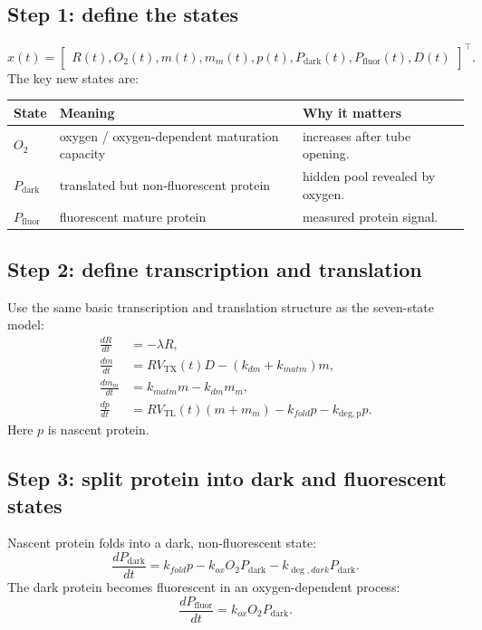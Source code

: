 \documentclass[11pt]{article}
\newcommand{\TX}{\mathrm{TX}}
\newcommand{\TL}{\mathrm{TL}}
\newcommand{\degp}{\mathrm{deg,p}}
\newcommand{\dark}{\mathrm{dark}}
\newcommand{\fluor}{\mathrm{fluor}}
\begin{document}
\subsection{Step 1: define the states}

\begin{equation}
    x(t)=
    \begin{bmatrix}
        R(t),
        O_2(t),
        m(t),
        m_m(t),
        p(t),
        P_{\dark}(t),
        P_{\fluor}(t),
        D(t)
    \end{bmatrix}^{\top}.
\end{equation}
The key new states are:
\begin{center}
\begin{tabularx}{\textwidth}{llX}
\toprule
State & Meaning & Why it matters \\
\midrule
$O_2$ & oxygen / oxygen-dependent maturation capacity & increases after tube opening. \\
$P_{\dark}$ & translated but non-fluorescent protein & hidden pool revealed by oxygen. \\
$P_{\fluor}$ & fluorescent mature protein & measured protein signal. \\
\bottomrule
\end{tabularx}
\end{center}

\subsection{Step 2: define transcription and translation}

Use the same basic transcription and translation structure as the seven-state model:
\begin{align}
    \frac{dR}{dt} &= -\lambda R, \\
    \frac{dm}{dt} &= R V_{\TX}(t)D-(k_{dm}+k_{matm})m, \\
    \frac{dm_m}{dt} &= k_{matm}m-k_{dm}m_m, \\
    \frac{dp}{dt} &= R V_{\TL}(t)(m+m_m)-k_{fold}p-k_{\degp}p.
\end{align}
Here $p$ is nascent protein.

\subsection{Step 3: split protein into dark and fluorescent states}

Nascent protein folds into a dark, non-fluorescent state:
\begin{equation}
    \frac{dP_{\dark}}{dt}
    =
    k_{fold}p
    -k_{ox}O_2P_{\dark}
    -k_{\deg,dark}P_{\dark}.
\end{equation}
The dark protein becomes fluorescent in an oxygen-dependent process:
\begin{equation}
    \frac{dP_{\fluor}}{dt}
    =
    k_{ox}O_2P_{\dark}.
\end{equation}
\end{document}

